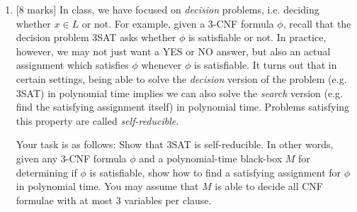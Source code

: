 \documentclass{article}
\begin{document}
\begin{enumerate}
    \item {[8 marks]} In class, we have focused on \emph{decision} problems, i.e. deciding whether $x\in L$ or not. For example, given a 3-CNF formula $\phi$, recall that the decision problem 3SAT asks whether $\phi$ is satisfiable or not. In practice, however, we may not just want a YES or NO answer, but also an actual assignment which satisfies $\phi$ whenever $\phi$ is satisfiable. It turns out that in certain settings, being able to solve the \emph{decision} version of the problem (e.g. 3SAT) in polynomial time implies we can also solve the \emph{search} version (e.g. find the satisfying assignment itself) in polynomial time. Problems satisfying this property are called \emph{self-reducible}.

Your task is as follows: Show that 3SAT is self-reducible. In other words, given any 3-CNF formula $\phi$ and a polynomial-time black-box $M$ for determining if $\phi$ is satisfiable, show how to find a satisfying assignment for $\phi$ in polynomial time. You may assume that $M$ is able to decide all CNF formulae with {at most} 3 variables per clause.
\end{enumerate}
\end{document}
